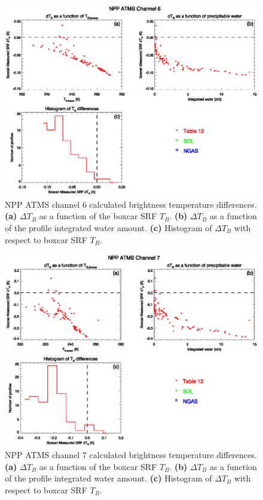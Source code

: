 \begin{figure}[H]
  \centering
  \includegraphics[scale=1]{graphics/dtb/atms_npp.ch6.TbStats.eps}
  \caption{NPP ATMS channel 6 calculated brightness temperature differences. \textbf{(a)} $\Delta T_B$ as a function of the boxcar SRF $T_B$. \textbf{(b)} $\Delta T_B$ as a function of the profile integrated water amount. \textbf{(c)} Histogram of $\Delta T_B$ with respect to boxcar SRF $T_B$.}
  \label{fig:atms_npp.ch6.dtb}
\end{figure}

\begin{figure}[H]
  \centering
  \includegraphics[scale=1]{graphics/dtb/atms_npp.ch7.TbStats.eps}
  \caption{NPP ATMS channel 7 calculated brightness temperature differences. \textbf{(a)} $\Delta T_B$ as a function of the boxcar SRF $T_B$. \textbf{(b)} $\Delta T_B$ as a function of the profile integrated water amount. \textbf{(c)} Histogram of $\Delta T_B$ with respect to boxcar SRF $T_B$.}
  \label{fig:atms_npp.ch7.dtb}
\end{figure}

